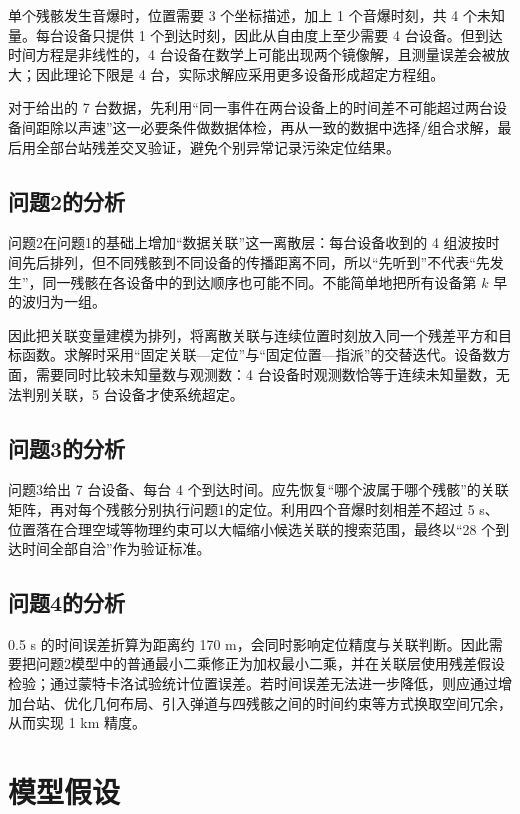\documentclass[12pt,a4paper]{article}
\begin{document}
单个残骸发生音爆时，位置需要 3 个坐标描述，加上 1 个音爆时刻，共 4 个未知量。每台设备只提供 1 个到达时刻，因此从自由度上至少需要 4 台设备。但到达时间方程是非线性的，4 台设备在数学上可能出现两个镜像解，且测量误差会被放大；因此理论下限是 4 台，实际求解应采用更多设备形成超定方程组。

对于给出的 7 台数据，先利用“同一事件在两台设备上的时间差不可能超过两台设备间距除以声速”这一必要条件做数据体检，再从一致的数据中选择/组合求解，最后用全部台站残差交叉验证，避免个别异常记录污染定位结果。

\subsection{问题2的分析}

问题2在问题1的基础上增加“数据关联”这一离散层：每台设备收到的 4 组波按时间先后排列，但不同残骸到不同设备的传播距离不同，所以“先听到”不代表“先发生”，同一残骸在各设备中的到达顺序也可能不同。不能简单地把所有设备第 $k$ 早的波归为一组。

因此把关联变量建模为排列，将离散关联与连续位置时刻放入同一个残差平方和目标函数。求解时采用“固定关联—定位”与“固定位置—指派”的交替迭代。设备数方面，需要同时比较未知量数与观测数：4 台设备时观测数恰等于连续未知量数，无法判别关联，5 台设备才使系统超定。

\subsection{问题3的分析}

问题3给出 7 台设备、每台 4 个到达时间。应先恢复“哪个波属于哪个残骸”的关联矩阵，再对每个残骸分别执行问题1的定位。利用四个音爆时刻相差不超过 5 s、位置落在合理空域等物理约束可以大幅缩小候选关联的搜索范围，最终以“28 个到达时间全部自洽”作为验证标准。

\subsection{问题4的分析}

0.5 s 的时间误差折算为距离约 170 m，会同时影响定位精度与关联判断。因此需要把问题2模型中的普通最小二乘修正为加权最小二乘，并在关联层使用残差假设检验；通过蒙特卡洛试验统计位置误差。若时间误差无法进一步降低，则应通过增加台站、优化几何布局、引入弹道与四残骸之间的时间约束等方式换取空间冗余，从而实现 1 km 精度。

\section{模型假设}
\end{document}
